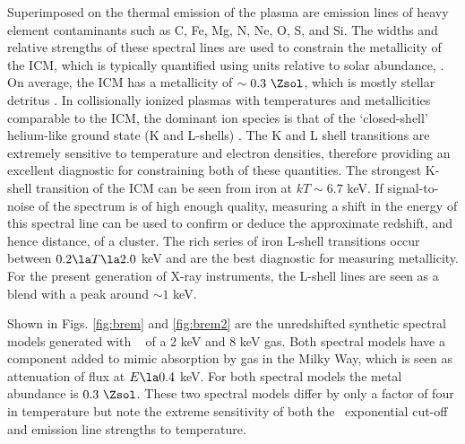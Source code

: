 Superimposed on the thermal emission of the plasma are emission lines
of heavy element contaminants such as C, Fe, Mg, N, Ne, O, S, and
Si. The widths and relative strengths of these spectral lines are used
to constrain the metallicity of the ICM, which is typically quantified
using units relative to solar abundance,
. On average, the
ICM has a metallicity of $\sim 0.3~\Zsol$, which is mostly stellar
detritus \citep{icmmetal1, icmmetal2, icmmetal3}. In collisionally
ionized plasmas with temperatures and metallicities comparable to the
ICM, the dominant ion species is that of the `closed-shell'
helium-like ground state (K and L-shells) \citep{cfreview}. The K and
L shell transitions are extremely sensitive to temperature and
electron densities, therefore providing an excellent diagnostic for
constraining both of these quantities. The strongest K-shell
transition of the ICM can be seen from iron at $kT \sim 6.7$ keV. If
signal-to-noise of the spectrum is of high enough quality, measuring a
shift in the energy of this spectral line can be used to confirm or
deduce the approximate redshift, and hence distance, of a cluster. The
rich series of iron L-shell transitions occur between $0.2 \la T \la
2.0$ keV and are the best diagnostic for measuring metallicity. For
the present generation of X-ray instruments, the L-shell lines are
seen as a blend with a peak around $\sim 1$ keV.

Shown in Figs. \ref{fig:brem} and \ref{fig:brem2} are the unredshifted
synthetic spectral models generated with \xspec\ \citep{xspec} of a 2
keV and 8 keV gas. Both spectral models have a component added to
mimic absorption by gas in the Milky Way, which is seen as attenuation
of flux at $E \la 0.4$ keV. For both spectral models the metal
abundance is $0.3~\Zsol$. These two spectral models differ by only a
factor of four in temperature but note the extreme sensitivity of both
the \tb\ exponential cut-off and emission line strengths to
temperature.


